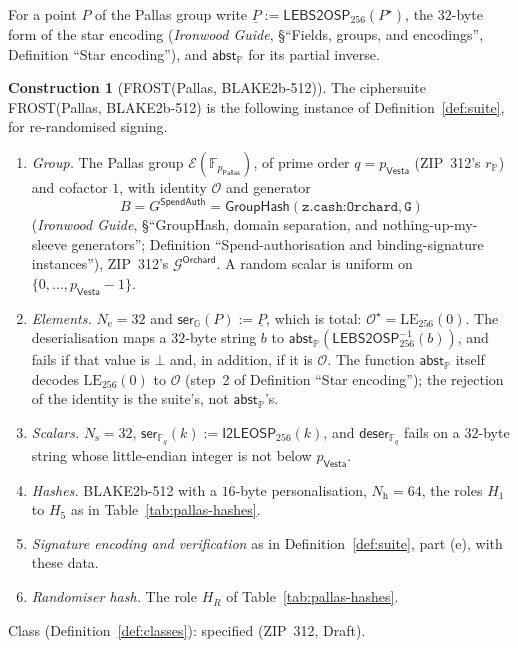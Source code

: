 \documentclass[11pt,a4paper]{article}
\theoremstyle{definition}
\newtheorem{construction}[theorem]{Construction}
\newcommand{\F}{\mathbb{F}}
\newcommand{\G}{\mathbb{G}}
\newcommand{\PP}{\mathbb{P}}
\newcommand{\Fq}{\F_q}
\newcommand{\Pallas}{\ensuremath{\mathsf{Pallas}}}
\newcommand{\Vesta}{\ensuremath{\mathsf{Vesta}}}
\newcommand{\Ep}{\ensuremath{\mathcal{E}}}
\newcommand{\GroupHash}{\ensuremath{\mathsf{GroupHash}}}
\begin{document}
For a point \(P\) of the Pallas group write
\(\underline{P} := \mathsf{LEBS2OSP}_{256}(P^{\star})\), the \(32\)-byte
form of the star encoding (\emph{Ironwood Guide}, \S``Fields, groups, and
encodings'', Definition ``Star encoding''), and \(\mathsf{abst}_{\PP}\) for
its partial inverse.

\begin{construction}[FROST(Pallas, BLAKE2b-512)]\label{def:pallas-suite}
The ciphersuite FROST(Pallas, BLAKE2b-512) is the following instance of
Definition~\ref{def:suite}, for re-randomised signing.
\begin{enumerate}
\item[(a)] \emph{Group.} The Pallas group \(\Ep(\F_{p_{\Pallas}})\), of
  prime order \(q = p_{\Vesta}\) (ZIP~312's \(r_{\PP}\)) and cofactor \(1\),
  with identity \(\mathcal{O}\) and generator
  \[
    B = G^{\mathsf{SpendAuth}} = \GroupHash(\texttt{z.cash:Orchard},
    \texttt{G})
  \]
  (\emph{Ironwood Guide}, \S``GroupHash, domain separation, and
  nothing-up-my-sleeve generators''; Definition ``Spend-authorisation and
  binding-signature instances''), ZIP~312's \(\mathcal{G}^{\mathsf{Orchard}}\).
  A random scalar is uniform on \(\{0, \dots, p_{\Vesta} - 1\}\).
\item[(b)] \emph{Elements.} \(N_{\mathrm{e}} = 32\) and
  \(\mathsf{ser}_{\G}(P) := \underline{P}\), which is total:
  \(\mathcal{O}^{\star} = \mathrm{LE}_{256}(0)\). The deserialisation maps a
  \(32\)-byte string \(b\) to
  \(\mathsf{abst}_{\PP}(\mathsf{LEBS2OSP}_{256}^{-1}(b))\), and fails if
  that value is \(\bot\) and, in addition, if it is \(\mathcal{O}\). The
  function \(\mathsf{abst}_{\PP}\) itself decodes \(\mathrm{LE}_{256}(0)\)
  to \(\mathcal{O}\) (step~2 of Definition ``Star encoding''); the rejection
  of the identity is the suite's, not \(\mathsf{abst}_{\PP}\)'s.
\item[(c)] \emph{Scalars.} \(N_{\mathrm{s}} = 32\),
  \(\mathsf{ser}_{\Fq}(k) := \mathsf{I2LEOSP}_{256}(k)\), and
  \(\mathsf{deser}_{\Fq}\) fails on a \(32\)-byte string whose little-endian
  integer is not below \(p_{\Vesta}\).
\item[(d)] \emph{Hashes.} BLAKE2b-512 with a \(16\)-byte
  personalisation, \(N_{\mathrm{h}} = 64\), the roles \(H_1\) to \(H_5\)
  as in Table~\ref{tab:pallas-hashes}.
\item[(e)] \emph{Signature encoding and verification} as in
  Definition~\ref{def:suite}, part (e), with these data.
\item[(f)] \emph{Randomiser hash.} The role \(H_R\) of
  Table~\ref{tab:pallas-hashes}.
\end{enumerate}
Class (Definition~\ref{def:classes}): specified (ZIP~312, Draft).
\end{construction}
\end{document}
